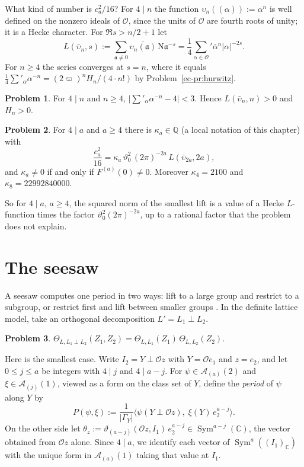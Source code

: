 \documentclass[reqno]{amsart}
\newcounter{chap}
\theoremstyle{definition}
\newtheorem{problem}{Problem}[section]
\theoremstyle{plain}
\newcommand{\Q}{\mathbb{Q}}
\newcommand{\C}{\mathbb{C}}
\newcommand{\Oc}{\mathcal{O}}
\newcommand{\Ac}{\mathcal{A}}
\newcommand{\Sym}{\operatorname{Sym}}
\newcommand{\Nm}{\mathrm{N}}
\begin{document}
What kind of number is \(c_a^2/16\)?  For \(4 \mid n\) the function \(\upsilon_n((\alpha)) := \alpha^n\) is well defined on the nonzero ideals of \(\Oc\), since the units of \(\Oc\) are fourth roots of unity; it is a Hecke character.  For \(\Re s > n/2 + 1\) let
\[
  L(\bar\upsilon_n, s) := \sum_{\mathfrak{a} \ne 0} \overline{\upsilon_n(\mathfrak{a})}\, \Nm\mathfrak{a}^{-s} = \frac14 \sum_{\alpha \in \Oc}{}' \bar\alpha^n \lvert\alpha\rvert^{-2s} .
\]
For \(n \ge 4\) the series converges at \(s = n\), where it equals \(\frac14\sum'_\alpha \alpha^{-n} = (2\varpi)^n H_n/(4\cdot n!)\) by Problem~\ref{ec-pr:hurwitz}.

\begin{problem}\label{pr:hecke-positive}
For \(4 \mid n\) and \(n \ge 4\), \(\bigl\lvert \sum'_\alpha \alpha^{-n} - 4 \bigr\rvert < 3\).  Hence \(L(\bar\upsilon_n, n) > 0\) and \(H_n > 0\).
\end{problem}

\begin{problem}\label{pr:hecke-norm}
For \(4 \mid a\) and \(a \ge 4\) there is \(\kappa_a \in \Q\) (a local notation of this chapter) with
\[
  \frac{c_a^2}{16} = \kappa_a\, \vartheta_0^2\, (2\pi)^{-2a}\, L(\bar\upsilon_{2a}, 2a) ,
\]
and \(\kappa_a \ne 0\) if and only if \(F^{(a)}(0) \ne 0\).  Moreover \(\kappa_4 = 2100\) and \(\kappa_8 = 22992840000\).
\end{problem}

So for \(4 \mid a\), \(a \ge 4\), the squared norm of the smallest lift is a value of a Hecke \(L\)-function times the factor \(\vartheta_0^2(2\pi)^{-2a}\), up to a rational factor that the problem does not explain.

\section{The seesaw}\label{sec:seesaw}

A seesaw computes one period in two ways: lift to a large group and restrict to a subgroup, or restrict first and lift between smaller groups \cite{Ku}.  In the definite lattice model, take an orthogonal decomposition \(L' = L_1 \perp L_2\).

\begin{problem}\label{pr:factor}
\(\Theta_{L, L_1 \perp L_2}(Z_1, Z_2) = \Theta_{L, L_1}(Z_1)\, \Theta_{L, L_2}(Z_2)\).
\end{problem}

Here is the smallest case.  Write \(I_2 = Y \perp \Oc z\) with \(Y = \Oc e_1\) and \(z = e_2\), and let \(0 \le j \le a\) be integers with \(4 \mid j\) and \(4 \mid a - j\).  For \(\psi \in \Ac_{(a)}(2)\) and \(\xi \in \Ac_{(j)}(1)\), viewed as a form on the class set of \(Y\), define the \emph{period} of \(\psi\) along \(Y\) by
\[
  P(\psi, \xi) := \frac{1}{\lvert\Gamma_Y\rvert} \bigl\langle \psi(Y \perp \Oc z),\; \xi(Y)\, e_2^{a-j} \bigr\rangle .
\]
On the other side let \(\theta_z := \vartheta_{(a-j)}(\Oc z, I_1)\, e_2^{a-j} \in \Sym^{a-j}(\C)\), the vector obtained from \(\Oc z\) alone.  Since \(4\mid a\), we identify each vector of \(\Sym^a((I_1)_\C)\) with the unique form in \(\Ac_{(a)}(1)\) taking that value at \(I_1\).
\end{document}
